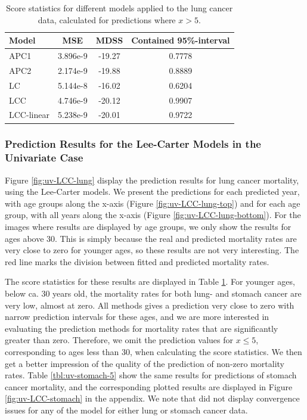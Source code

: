 \begin{table}[h!]
    \begin{center}
        \begin{tabular}{l |c c c }
            Model & MSE &   MDSS & Contained 95\%-interval\\
            \hline
            APC1    & 3.896e-9 & -19.27    & 0.7778 \\
            APC2    & 2.174e-9 & -19.88    & 0.8889 \\
            LC      & 5.144e-8 & -16.02    & 0.6204 \\
            LCC     & 4.746e-9 & -20.12    & 0.9907 \\
            LCC-linear      & 5.238e-9 & -20.01    & 0.9722 \\
        \end{tabular}
        \caption{Score statistics for different models applied to the lung cancer data, calculated for predictions where $x > 5$.}\label{tbl:uv-lung-5}
    \end{center}
\end{table}

\subsubsection{Prediction Results for the Lee-Carter Models in the Univariate Case}

\newpar Figure \ref{fig:uv-LCC-lung} display the prediction results for lung cancer mortality, using the Lee-Carter models. We present the predictions for each predicted year, with age groups along the x-axis (Figure \ref{fig:uv-LCC-lung-top}) and for each age group, with all years along the x-axis (Figure \ref{fig:uv-LCC-lung-bottom}). For the images where results are displayed by age groups, we only show the results for ages above 30. This is simply because the real and predicted mortality rates are very close to zero for younger ages, so these results are not very interesting. The red line marks the division between fitted and predicted mortality rates. 

\newpar The score statistics for these results are displayed in Table \ref{tbl:uv-lung-5}. For younger ages, below ca. 30 years old, the mortality rates for both lung- and stomach cancer are very low, almost at zero. All methods gives a prediction very close to zero with narrow prediction intervals for these ages, and we are more interested in evaluating the prediction methods for mortality rates that are significantly greater than zero. Therefore, we omit the prediction values for $x \leq 5$, corresponding to ages less than 30, when calculating the score statistics. We then get a better impression of the quality of the prediction of non-zero mortality rates. Table \ref{tbl:uv-stomach-5} show the same results for predictions of stomach cancer mortality, and the corresponding plotted results are displayed in Figure \ref{fig:uv-LCC-stomach} in the appendix. We note that \inlabru did not display convergence issues for any of the model for either lung or stomach cancer data. 

